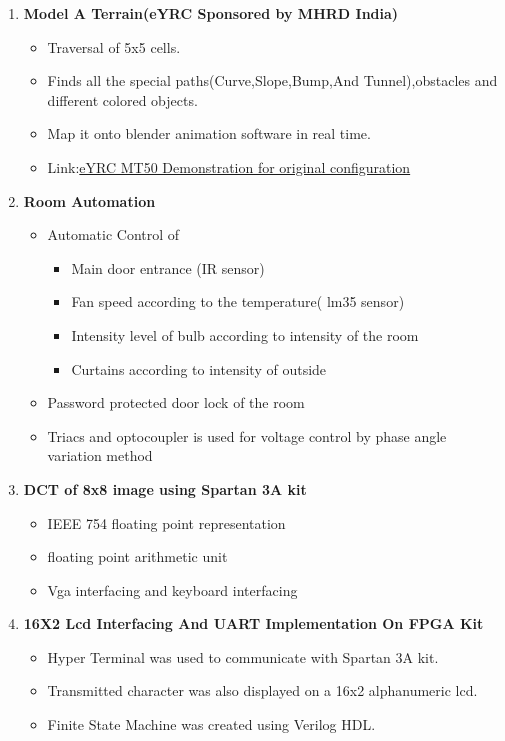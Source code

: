 \documentclass[10pt]{article}
\newcommand{\main}{\par\noindent\hspace*{0pt}\ignorespaces}
\begin{document}
\main{\Large\textbf{PROJECTS:}}
\begin{enumerate}
	\item \textbf{Model A Terrain(eYRC Sponsored by MHRD India)}
	\begin{itemize}
		\item Traversal of 5x5 cells.
		\item Finds all the special paths(Curve,Slope,Bump,And Tunnel),obstacles and different colored objects.
		\item Map it onto blender animation software in real time.
		\item Link:\href{https://youtu.be/Ugt36jvnVoE}{eYRC MT50 Demonstration for original configuration}
	\end{itemize}
	\item\textbf{Room Automation}								
	\begin{itemize}		     
		\item Automatic Control of
		\begin{itemize}
			\item Main door entrance (IR sensor)
			\item Fan speed according to the temperature( lm35 sensor)
			\item Intensity level of bulb according to intensity of the room
			\item Curtains according to intensity of outside
		\end{itemize}
		\item Password protected door lock of the room
		\item Triacs and optocoupler is used for voltage control by phase angle variation method
	\end{itemize}
	\item \textbf{DCT of 8x8 image using Spartan 3A kit}						
	\begin{itemize}
		\item IEEE 754 floating point representation
		\item floating point arithmetic unit 
		\item Vga interfacing and keyboard interfacing
	\end{itemize}
	
	\item \textbf{16X2 Lcd Interfacing And UART Implementation On FPGA Kit}
	\begin{itemize}
		\item 	Hyper Terminal was used to communicate with Spartan 3A kit.
		\item 	Transmitted character was also displayed on a 16x2 alphanumeric lcd. 
		\item	Finite State Machine was created using Verilog HDL.	
	\end{itemize}
\end{enumerate}
\end{document}
